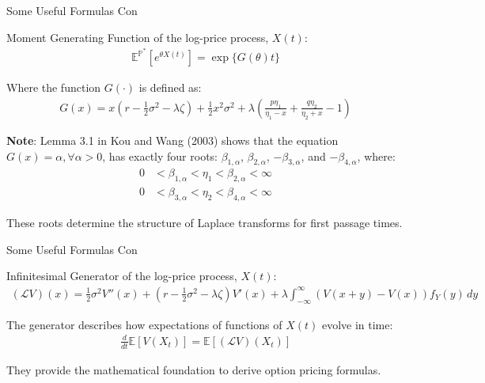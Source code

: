 \documentclass{beamer}
\begin{document}
\begin{frame}{Some Useful Formulas Con}

    {\footnotesize \footnotesize
    \par Moment Generating Function of the log-price process, \( X(t) \):
    \begin{align*}
        \mathbb{E}^{\mathbb{P}^*} \left[ e^{\theta X(t)} \right] = \exp\{G(\theta)t\}
    \end{align*}
    \par Where the function $G(\cdot)$ is defined as:
    \begin{align*}
        G(x) = x \left( r - \frac{1}{2} \sigma^2 - \lambda \zeta \right) + \frac{1}{2} x^2 \sigma^2 
        + \lambda \left( \frac{p \eta_1}{\eta_1 - x} + \frac{q \eta_2}{\eta_2 + x} - 1 \right)
    \end{align*}
    \par \textbf{Note}: Lemma 3.1 in Kou and Wang (2003) shows that the 
    equation \( G(x) = \alpha, \forall \alpha > 0 \), has exactly 
    four roots: \(\beta_{1,\alpha}\), \(\beta_{2,\alpha}\), \(-\beta_{3,\alpha}\), and \(-\beta_{4,\alpha}\), where: 
    \begin{align*}
        0 &< \beta_{1,\alpha} < \eta_1 < \beta_{2,\alpha} < \infty\\
        0 &< \beta_{3,\alpha} < \eta_2 < \beta_{4,\alpha} < \infty
    \end{align*}
    \par These roots determine the structure of Laplace transforms for first passage times.
    }
    
\end{frame}
\begin{frame}{Some Useful Formulas Con}

    {\footnotesize \footnotesize
    \par Infinitesimal Generator of the log-price process, \( X(t) \):
    \vspace{1em}
    \begin{align*}
        (\mathcal{L}V)(x) = \frac{1}{2}\sigma^2 V''(x) + \left(r - \frac{1}{2}\sigma^2 
        - \lambda\zeta\right)V'(x) + \lambda \int_{-\infty}^{\infty}\left(V(x+y) - V(x)\right)f_Y(y)\,dy
    \end{align*}
    \vspace{1em}
    \par The generator describes how expectations of functions of \( X(t) \) evolve in time:
    \vspace{1em}
    \begin{align*}
        \frac{d}{dt}\mathbb{E}[V(X_t)] = \mathbb{E}[(\mathcal{L}V)(X_t)]
    \end{align*}
    \vspace{1em}
    \par They provide the mathematical foundation to derive option pricing formulas.



    }
    
\end{frame}
\end{document}
